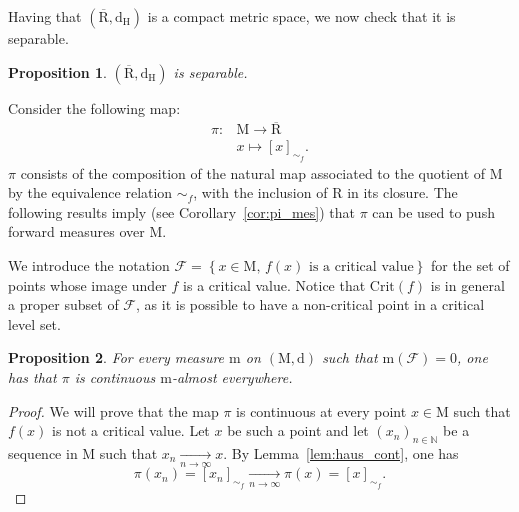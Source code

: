\documentclass[pdflatex,sn-mathphys-ay]{sn-jnl}%
\newtheorem{proposition}{Proposition}[section]
\newcommand{\reeb}{\mathrm{R}}
\newcommand{\man}{\mathrm{M}}
\newcommand{\mes}{\mathrm{m}}
\newcommand{\dis}{\mathrm{d}}
\newcommand{\critic}{{\mathrm {Crit}}}
\newcommand{\haus}{{\mathrm {d_H}}}
\newcommand{\converge}{\underset{n\rightarrow\infty}{\longrightarrow}}
\newcommand{\N}{\mathbb{N}}
\newcommand{\change}[1]{\noindent #1}
\theoremstyle{thmstyleone}%
\begin{document}
\change{ Having that $(\overline{\reeb},\haus)$ is a compact metric space, we now check that it is separable.}

\begin{proposition}\label{prop:reeb_sep}$(\overline{\reeb},\haus)$ is separable.
\end{proposition}

Consider the following map:
\begin{align*}
\pi\colon&\man\longrightarrow\overline{\reeb}\\
&x\longmapsto[x]_{\sim_f}.
\end{align*}
$\pi$ consists of the composition of the natural map associated to the quotient of $\man$ by the equivalence relation $\sim_f$, with the inclusion of $\reeb$ in its closure. \change{The following results imply (see Corollary~\ref{cor:pi_mes}) that $\pi$ can be used to push forward measures over $\man$.}

 
We introduce the notation $\mathcal{F}=\left\{x\in\man,\,f(x)\text{ is a critical value}\right\} $ for the set of points whose image under $f$ is a critical value. Notice that $\critic(f)$ is in general a proper subset of $\mathcal{F}$, as it is possible to have a non-critical point in a critical level set.

\begin{proposition}\label{prop:pi_cont}  For every measure $\mes$ on $(\man,\dis)$ such that $\mes(\mathcal{F})=0$, one has that
$\pi$ is continuous $\mes$-almost everywhere.
\end{proposition}

\begin{proof}
We will prove that the map $\pi$ is continuous at every point $x\in\man$ such that $f(x)$ is not a critical value. Let $x$ be such a point and let $(x_n)_{n\in\N}$ be a sequence in $\man$ such that $x_n\converge x$. By Lemma~\ref{lem:haus_cont}, one has $$\pi(x_n)=[x_n]_{\sim_f}\converge \pi(x)=[x]_{\sim_f}.$$
\end{proof}
\end{document}

